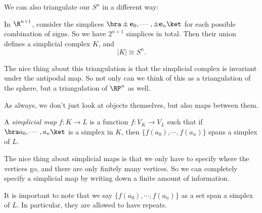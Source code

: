 \documentclass[a4paper]{article}
\begin{document}
We can also triangulate our $S^n$ in a different way:
\begin{eg}
  In $\R^{n + 1}$, consider the simplices $ \bra \pm \mathbf{e}_0, \cdots, \pm \mathbf{e}_n\ket$ for each possible combination of signs. So we have $2^{n + 1}$ simplices in total. Then their union defines a simplicial complex $K$, and
  \[
    |K| \cong S^n.
  \]
  \begin{center}
  \end{center}
\end{eg}
The nice thing about this triangulation is that the simplicial complex is invariant under the antipodal map. So not only can we think of this as a triangulation of the sphere, but a triangulation of $\RP^n$ as well.

As always, we don't just look at objects themselves, but also maps between them.

\begin{defi}
  A \emph{simplicial map} $f: K \to L$ is a function $f: V_K \to V_L$ such that if $\bra a_0, \cdots, a_n\ket$ is a simplex in $K$, then $\{f(a_0), \cdots, f(a_n)\}$ spans a simplex of $L$.
\end{defi}
The nice thing about simplicial maps is that we only have to specify where the vertices go, and there are only finitely many vertices. So we can completely specify a simplicial map by writing down a finite amount of information.

It is important to note that we say $\{f(a_0), \cdots, f(a_n)\}$ as a set span a simplex of $L$. In particular, they are allowed to have repeats.
\end{document}
